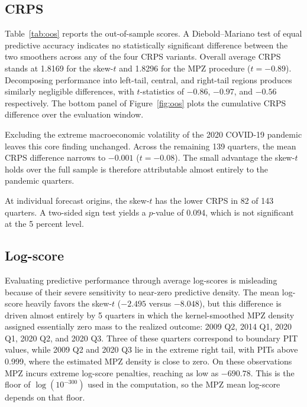 \documentclass[12pt]{report} %
\begin{document}
\subsection{CRPS}
\label{subsec:crps}

Table~\ref{tab:oos} reports the out-of-sample scores. A Diebold–Mariano test \parencite{diebold1995comparing} of equal predictive accuracy indicates no statistically significant difference between the two smoothers across any of the four CRPS variants. Overall average CRPS stands at 1.8169 for the skew-$t$ and 1.8296 for the MPZ procedure ($t = -0.89$). Decomposing performance into left-tail, central, and right-tail regions produces similarly negligible differences, with $t$-statistics of $-0.86$, $-0.97$, and $-0.56$ respectively. The bottom panel of Figure~\ref{fig:oos} plots the cumulative CRPS difference over the evaluation window.

Excluding the extreme macroeconomic volatility of the 2020 COVID-19 pandemic leaves this core finding unchanged. Across the remaining 139 quarters, the mean CRPS difference narrows to $-0.001$ ($t = -0.08$). The small advantage the skew-$t$ holds over the full sample is therefore attributable almost entirely to the pandemic quarters.

At individual forecast origins, the skew-$t$ has the lower CRPS in 82 of 143 quarters. A two-sided sign test yields a $p$-value of 0.094, which is not significant at the 5 percent level.

\subsection{Log-score}
\label{subsec:logscore}

Evaluating predictive performance through average log-scores is misleading because of their severe sensitivity to near-zero predictive density. The mean log-score heavily favors the skew-$t$ ($-2.495$ versus $-8.048$), but this difference is driven almost entirely by 5 quarters in which the kernel-smoothed MPZ density assigned essentially zero mass to the realized outcome: 2009 Q2, 2014 Q1, 2020 Q1, 2020 Q2, and 2020 Q3. Three of these quarters correspond to boundary PIT values, while 2009 Q2 and 2020 Q3 lie in the extreme right tail, with PITs above 0.999, where the estimated MPZ density is close to zero. On these observations MPZ incurs extreme log-score penalties, reaching as low as $-690.78$. This is the floor of $\log(10^{-300})$ used in the computation, so the MPZ mean log-score depends on that floor.
\end{document}
